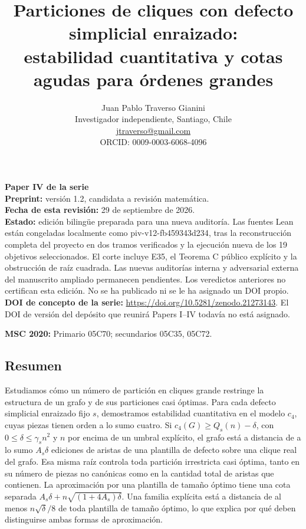 \documentclass[spanish,11pt,a4paper]{article}
\title{Particiones de cliques con defecto simplicial enraizado:\\estabilidad cuantitativa y cotas agudas para órdenes grandes}
\author{Juan Pablo Traverso Gianini\\
\small Investigador independiente, Santiago, Chile\\
\small \href{mailto:jtraverso@gmail.com}{jtraverso@gmail.com}\\
\small ORCID: 0009-0003-6068-4096}
\date{}
\begin{document}
\raggedbottom
\maketitle
\textbf{Paper IV de la serie}\\
\textbf{Preprint:} versión 1.2, candidata a revisión matemática.\\
\textbf{Fecha de esta revisión:} 29 de septiembre de 2026.\\
\textbf{Estado:} edición bilingüe preparada para una nueva auditoría. Las fuentes Lean están congeladas localmente como {\ttfamily\small piv-\discretionary{\hbox{\ensuremath{\hookrightarrow}}}{}{}v12-\discretionary{\hbox{\ensuremath{\hookrightarrow}}}{}{}fb459343d234}, tras la reconstrucción completa del proyecto en dos tramos verificados y la ejecución nueva de los 19 objetivos seleccionados. El corte incluye E35, el Teorema C público explícito y la obstrucción de raíz cuadrada. Las nuevas auditorías interna y adversarial externa del manuscrito ampliado permanecen pendientes. Los veredictos anteriores no certifican esta edición. No se ha publicado ni se le ha asignado un DOI propio. \textbf{DOI de concepto de la serie:} \url{https://doi.org/10.5281/zenodo.21273143}. El DOI de versión del depósito que reunirá Papers I--IV todavía no está asignado.

\textbf{MSC 2020:} Primario 05C70; secundarios 05C35, 05C72.

\subsection{Resumen}\label{resumen}

Estudiamos cómo un número de partición en cliques grande restringe la estructura de un grafo y de sus particiones casi óptimas. Para cada defecto simplicial enraizado fijo \(s\), demostramos estabilidad cuantitativa en el modelo \(c_4\), cuyas piezas tienen orden a lo sumo cuatro. Si \(c_4(G)\ge Q_s(n)-\delta\), con \(0\le\delta\le\gamma_s n^2\) y \(n\) por encima de un umbral explícito, el grafo está a distancia de a lo sumo \(A_s\delta\) ediciones de aristas de una plantilla de defecto sobre una clique real del grafo. Esa misma raíz controla toda partición irrestricta casi óptima, tanto en su número de piezas no canónicas como en la cantidad total de aristas que contienen. La aproximación por una plantilla de tamaño óptimo tiene una cota separada \(A_s\delta+n\sqrt{(1+4A_s)\delta}\). Una familia explícita está a distancia de al menos \(n\sqrt{\delta}/8\) de toda plantilla de tamaño óptimo, lo que explica por qué deben distinguirse ambas formas de aproximación.
\end{document}

